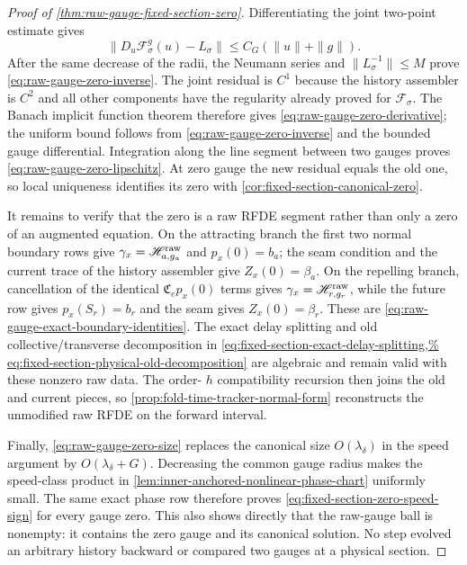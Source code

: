 \begin{proof}[Proof of
\cref{thm:raw-gauge-fixed-section-zero}]
Differentiating the joint two-point estimate gives
\begin{equation}
 \|D_u\mathcal F_\sigma^g(u)-L_\sigma\|
 \le C_G(\|u\|+\|g\|).                           \label{eq:proof-raw-gauge-derivative-perturbation}
\end{equation}
After the same decrease of the radii, the Neumann series and
\(\|L_\sigma^{-1}\|\le M\) prove
\cref{eq:raw-gauge-zero-inverse}.  The joint residual is \(C^1\) because
the history assembler is \(C^2\) and all other components have the
regularity already proved for \(\mathcal F_\sigma\).  The Banach implicit
function theorem therefore gives \cref{eq:raw-gauge-zero-derivative}; the
uniform bound follows from \cref{eq:raw-gauge-zero-inverse} and the
bounded gauge differential.  Integration along the line segment between
two gauges proves \cref{eq:raw-gauge-zero-lipschitz}.  At zero gauge the
new residual equals the old one, so local uniqueness identifies its zero
with \cref{cor:fixed-section-canonical-zero}.

It remains to verify that the zero is a raw RFDE segment rather than only a
zero of an augmented equation.  On the attracting branch the first two
normal boundary rows give
\(\gamma_x=\mathscr H_{a,g_a}^{\rm raw}\) and
\(p_x(0)=b_a\); the seam condition and the current trace of the history
assembler give \(Z_x(0)=\beta_a\).  On the repelling branch, cancellation
of the identical \(\mathfrak C_ep_x(0)\) terms gives
\(\gamma_x=\mathscr H_{r,g_r}^{\rm raw}\), while the future row gives
\(p_x(S_r)=b_r\) and the seam gives \(Z_x(0)=\beta_r\).  These are
\cref{eq:raw-gauge-exact-boundary-identities}.  The exact delay splitting
and old collective/transverse decomposition in
\cref{eq:fixed-section-exact-delay-splitting,%
eq:fixed-section-physical-old-decomposition}
are algebraic and remain valid with these nonzero raw data.  The order-
\(h\) compatibility recursion then joins the old and current pieces, so
\cref{prop:fold-time-tracker-normal-form} reconstructs the unmodified raw
RFDE on the forward interval.

Finally, \cref{eq:raw-gauge-zero-size} replaces the canonical size
\(O(\lambda_\delta)\) in the speed argument by
\(O(\lambda_\delta+G)\).  Decreasing the common gauge radius makes the
speed-class product in
\cref{lem:inner-anchored-nonlinear-phase-chart} uniformly small.  The same
exact phase row therefore proves
\cref{eq:fixed-section-zero-speed-sign} for every gauge zero.  This also
shows directly that the raw-gauge ball is nonempty: it contains the zero
gauge and its canonical solution.  No step evolved an arbitrary history
backward or compared two gauges at a physical section.
\end{proof}

